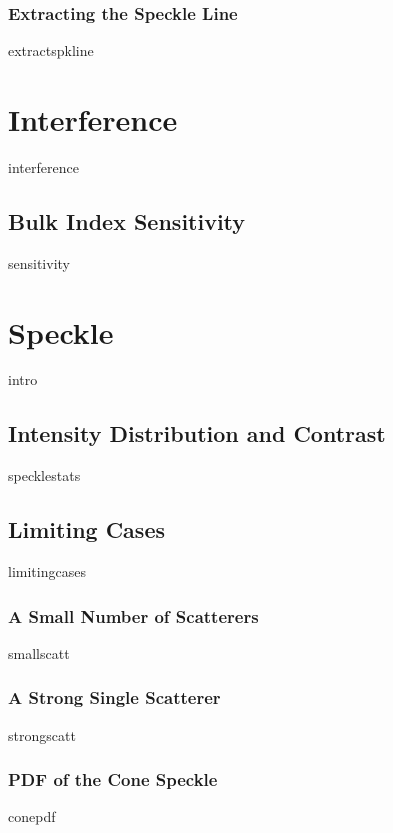 \documentclass[12pt,a4paper,titlepage,onecolumn]{report}
\begin{document}
\subsection{Extracting the Speckle Line}\label{sec:spkline}
{extractspkline}

\chapter{Interference}\label{ch:interference}
{interference}
\section{Bulk Index Sensitivity}
{sensitivity}

\chapter{Speckle}\label{ch:speckle}
{intro}
\section{Intensity Distribution and Contrast}
{specklestats}
\section{Limiting Cases}
{limitingcases}
\subsection{A Small Number of Scatterers}
{smallscatt}
\subsection{A Strong Single Scatterer}
{strongscatt}
\subsection{PDF of the Cone Speckle}
{conepdf}
\end{document}

